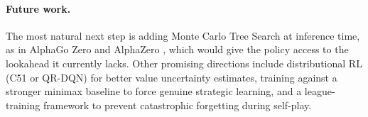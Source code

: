 \documentclass[10pt, letterpaper, twocolumn]{article}
\begin{document}
\paragraph{Future work.}
The most natural next step is adding Monte Carlo Tree Search at inference
time, as in AlphaGo Zero \citep{silver2017alphagozero} and AlphaZero
\citep{silver2018alphazero}, which would give the policy access to the
lookahead it currently lacks.  Other promising directions include
distributional RL (C51 or QR-DQN) for better value uncertainty
estimates, training against a stronger minimax baseline to force genuine
strategic learning, and a league-training framework to prevent
catastrophic forgetting during self-play.



\end{document}
